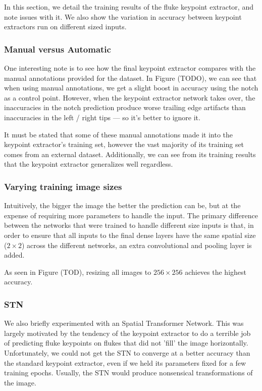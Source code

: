 In this section, we detail the training results of the fluke keypoint extractor, and note issues with it.
We also show the variation in accuracy between keypoint extractors run on different sized inputs.

\subsubsection{Manual versus Automatic}

One interesting note is to see how the final keypoint extractor compares with the manual annotations provided for the dataset.
In Figure (TODO), we can see that when using manual annotations, we get a slight boost in accuracy using the notch as a control point.
However, when the keypoint extractor network takes over, the inaccuracies in the notch prediction produce worse trailing edge artifacts than inaccuracies in the left / right tips --- so it's better to ignore it.

It must be stated that some of these manual annotations made it into the keypoint extractor's training set, however the vast majority of its training set comes from an external dataset.
Additionally, we can see from its training results that the keypoint extractor generalizes well regardless.

\subsubsection{Varying training image sizes}

Intuitively, the bigger the image the better the prediction can be, but at the expense of requiring more parameters to handle the input.
The primary difference between the networks that were trained to handle different size inputs is that, in order to ensure that all inputs to the final dense layers have the same spatial size ($2\times2$) across the different networks, an extra convolutional and pooling layer is added.

As seen in Figure (TOD), resizing all images to $256 \times 256$ achieves the highest accuracy.


\subsubsection{STN} %

We also briefly experimented with an Spatial Transformer Network.
This was largely motivated by the tendency of the keypoint extractor to do a terrible job of predicting fluke keypoints on flukes that did not 'fill' the image horizontally.
Unfortunately, we could not get the STN to converge at a better accuracy than the standard keypoint extractor, even if we held its parameters fixed for a few training epochs.
Usually, the STN would produce nonsensical transformations of the image.

